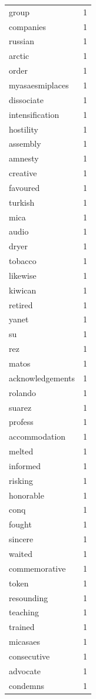 \begin{tabular}{lr}
group & 1 \\
companies & 1 \\
russian & 1 \\
arctic & 1 \\
order & 1 \\
myasaesmiplaces & 1 \\
dissociate & 1 \\
intensification & 1 \\
hostility & 1 \\
assembly & 1 \\
amnesty & 1 \\
creative & 1 \\
favoured & 1 \\
turkish & 1 \\
mica & 1 \\
audio & 1 \\
dryer & 1 \\
tobacco & 1 \\
likewise & 1 \\
kiwican & 1 \\
retired & 1 \\
yanet & 1 \\
su & 1 \\
rez & 1 \\
matos & 1 \\
acknowledgements & 1 \\
rolando & 1 \\
suarez & 1 \\
profess & 1 \\
accommodation & 1 \\
melted & 1 \\
informed & 1 \\
risking & 1 \\
honorable & 1 \\
conq & 1 \\
fought & 1 \\
sincere & 1 \\
waited & 1 \\
commemorative & 1 \\
token & 1 \\
resounding & 1 \\
teaching & 1 \\
trained & 1 \\
micasaes & 1 \\
consecutive & 1 \\
advocate & 1 \\
condemns & 1 \\

\end{tabular}

